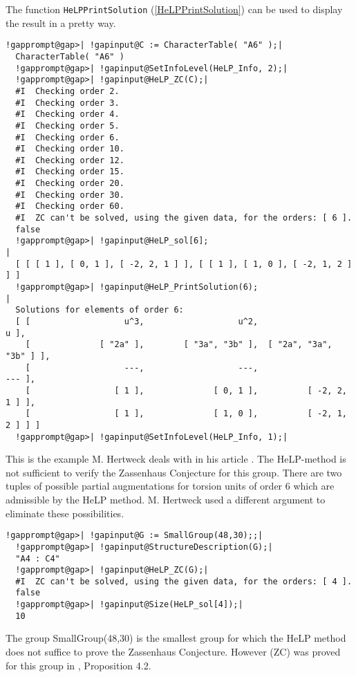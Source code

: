 \documentclass[a4paper,11pt]{report}
\begin{document}
{{ The function \texttt{HeLP{\textunderscore}PrintSolution} (\ref{HeLPPrintSolution}) can be used to display the result in a pretty way. 
\begin{Verbatim}[commandchars=!@|,fontsize=\small,frame=single,label=Example]
  !gapprompt@gap>| !gapinput@C := CharacterTable( "A6" );|
  CharacterTable( "A6" )
  !gapprompt@gap>| !gapinput@SetInfoLevel(HeLP_Info, 2);|
  !gapprompt@gap>| !gapinput@HeLP_ZC(C);|
  #I  Checking order 2.
  #I  Checking order 3.
  #I  Checking order 4.
  #I  Checking order 5.
  #I  Checking order 6.
  #I  Checking order 10.
  #I  Checking order 12.
  #I  Checking order 15.
  #I  Checking order 20.
  #I  Checking order 30.
  #I  Checking order 60.
  #I  ZC can't be solved, using the given data, for the orders: [ 6 ].
  false
  !gapprompt@gap>| !gapinput@HeLP_sol[6];                                          |
  [ [ [ 1 ], [ 0, 1 ], [ -2, 2, 1 ] ], [ [ 1 ], [ 1, 0 ], [ -2, 1, 2 ] ] ]
  !gapprompt@gap>| !gapinput@HeLP_PrintSolution(6);                                |
  Solutions for elements of order 6:
  [ [                   u^3,                   u^2,                     u ],
    [              [ "2a" ],        [ "3a", "3b" ],  [ "2a", "3a", "3b" ] ],
    [                   ---,                   ---,                   --- ],
    [                 [ 1 ],              [ 0, 1 ],          [ -2, 2, 1 ] ],
    [                 [ 1 ],              [ 1, 0 ],          [ -2, 1, 2 ] ] ]
  !gapprompt@gap>| !gapinput@SetInfoLevel(HeLP_Info, 1);|
\end{Verbatim}
 This is the example M. Hertweck deals with in his article \cite{HerA6}. The HeLP-method is not sufficient to verify the Zassenhaus Conjecture for
this group. There are two tuples of possible partial augmentations for torsion
units of order 6 which are admissible by the HeLP method. M. Hertweck used a
different argument to eliminate these possibilities. 
\begin{Verbatim}[commandchars=!@|,fontsize=\small,frame=single,label=Example]
  !gapprompt@gap>| !gapinput@G := SmallGroup(48,30);;|
  !gapprompt@gap>| !gapinput@StructureDescription(G);|
  "A4 : C4"
  !gapprompt@gap>| !gapinput@HeLP_ZC(G);|
  #I  ZC can't be solved, using the given data, for the orders: [ 4 ].
  false
  !gapprompt@gap>| !gapinput@Size(HeLP_sol[4]);|
  10
\end{Verbatim}
 The group SmallGroup(48,30) is the smallest group for which the HeLP method
does not suffice to prove the Zassenhaus Conjecture. However (ZC) was proved
for this group in \cite{HoefertKimmerle}, Proposition 4.2. 
}}
\end{document}
